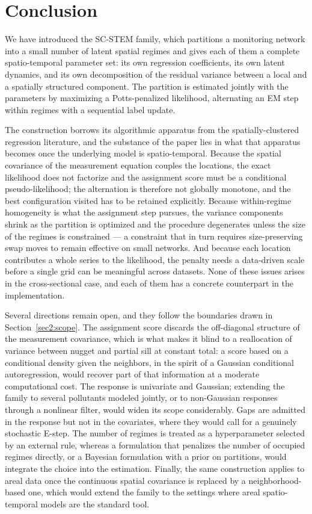 \section{Conclusion}\label{sec5}

We have introduced the SC-STEM family, which partitions a monitoring network into a small number of latent spatial regimes and gives each of them a complete spatio-temporal parameter set: its own regression coefficients, its own latent dynamics, and its own decomposition of the residual variance between a local and a spatially structured component. The partition is estimated jointly with the parameters by maximizing a Potts-penalized likelihood, alternating an EM step within regimes with a sequential label update.

The construction borrows its algorithmic apparatus from the spatially-clustered regression literature, and the substance of the paper lies in what that apparatus becomes once the underlying model is spatio-temporal. Because the spatial covariance of the measurement equation couples the locations, the exact likelihood does not factorize and the assignment score must be a conditional pseudo-likelihood; the alternation is therefore not globally monotone, and the best configuration visited has to be retained explicitly. Because within-regime homogeneity is what the assignment step pursues, the variance components shrink as the partition is optimized and the procedure degenerates unless the size of the regimes is constrained --- a constraint that in turn requires size-preserving swap moves to remain effective on small networks. And because each location contributes a whole series to the likelihood, the penalty needs a data-driven scale before a single grid can be meaningful across datasets. None of these issues arises in the cross-sectional case, and each of them has a concrete counterpart in the implementation.

Several directions remain open, and they follow the boundaries drawn in Section~\ref{sec2:scope}. The assignment score discards the off-diagonal structure of the measurement covariance, which is what makes it blind to a reallocation of variance between nugget and partial sill at constant total: a score based on a conditional density given the neighbors, in the spirit of a Gaussian conditional autoregression, would recover part of that information at a moderate computational cost. The response is univariate and Gaussian; extending the family to several pollutants modeled jointly, or to non-Gaussian responses through a nonlinear filter, would widen its scope considerably. Gaps are admitted in the response but not in the covariates, where they would call for a genuinely stochastic E-step. The number of regimes is treated as a hyperparameter selected by an external rule, whereas a formulation that penalizes the number of occupied regimes directly, or a Bayesian formulation with a prior on partitions, would integrate the choice into the estimation. Finally, the same construction applies to areal data once the continuous spatial covariance is replaced by a neighborhood-based one, which would extend the family to the settings where areal spatio-temporal models are the standard tool.

